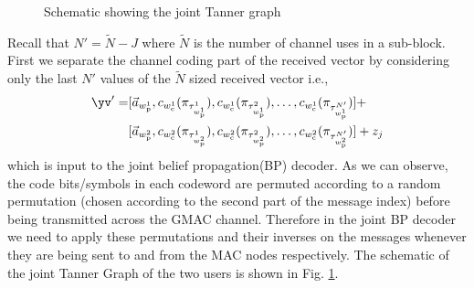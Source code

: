 \documentclass[final,onecolumn,12pt]{IEEEtran}
\begin{document}
\begin{figure}[h!]
  \centering
  \resizebox{0.5\textwidth}{!}{}
  \caption{Schematic showing the joint Tanner graph}
  \label{fig:decodergraph}
\end{figure}

Recall that $N'=\tilde{N}-J$ where $\tilde{N}$ is the number of channel uses in a sub-block. First we separate the channel coding part of the received vector by considering only the last $N'$ values of the $\tilde{N}$ sized received vector i.e.,
\begin{align*}
\yv'= &[\vec{a}_{w^1_\mathrm{p}},c_{w^1_\mathrm{c}}(\pi_{\tau_{w^1_\mathrm{p}}^1}),c_{w^1_\mathrm{c}}(\pi_{\tau_{w^1_\mathrm{p}}^2}),\ldots,c_{w^1_\mathrm{c}}(\pi_{\tau_{w^1_\mathrm{p}}^{N'}})]+\\
&[\vec{a}_{w^2_\mathrm{p}},c_{w^2_\mathrm{c}}(\pi_{\tau_{w^2_\mathrm{p}}^1}),c_{w^2_\mathrm{c}}(\pi_{\tau_{w^2_\mathrm{p}}^2}),\ldots,c_{w^2_\mathrm{c}}(\pi_{\tau_{w^2_\mathrm{p}}^{N'}})]+z_j
\end{align*}
which is input to the joint belief propagation(BP) decoder. As we can observe, the code bits/symbols in each codeword are permuted according to a random permutation (chosen according to the second part of the message index) before being transmitted across the GMAC channel. Therefore in the joint BP decoder we need to apply these permutations and their inverses on the messages whenever they are being sent to and from the MAC nodes respectively. The schematic of the joint Tanner Graph of the two users is shown in Fig. \ref{fig:decodergraph}.\\
\end{document}
